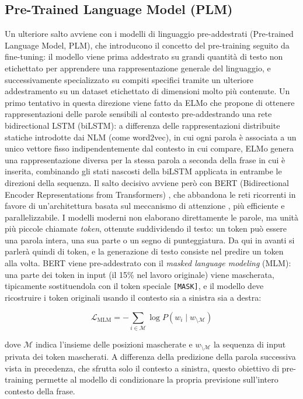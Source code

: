 \subsection{Pre-Trained Language Model (PLM)}
Un ulteriore salto avviene con i modelli di linguaggio pre-addestrati (Pre-trained Language Model, PLM),
 che introducono il concetto del pre-training seguito da fine-tuning: il modello viene prima addestrato su grandi quantità di testo
  non etichettato per apprendere una rappresentazione generale del linguaggio, e successivamente specializzato su compiti specifici 
  tramite un ulteriore addestramento su un dataset etichettato di dimensioni molto più contenute.
Un primo tentativo in questa direzione viene fatto da ELMo \cite{peters2018elmo} che propone di ottenere rappresentazioni delle parole
 sensibili al contesto pre-addestrando una rete bidirectional LSTM (biLSTM): a differenza delle rappresentazioni distribuite statiche 
 introdotte dai NLM (come word2vec), in cui ogni parola è associata a un unico vettore fisso indipendentemente dal contesto in cui 
 compare, ELMo genera una rappresentazione diversa per la stessa parola a seconda della frase in cui è inserita, combinando gli 
 stati nascosti della biLSTM applicata in entrambe le direzioni della sequenza.
Il salto decisivo avviene però con BERT (Bidirectional Encoder Representations from Transformers) \cite{devlin2018bert}, che 
abbandona le reti ricorrenti in favore di un'architettura basata sul meccanismo di attenzione \cite{vaswani2017attention}, più
 efficiente e parallelizzabile. I modelli moderni non elaborano direttamente le parole, ma unità più piccole chiamate \emph{token}, ottenute suddividendo il testo: un token può essere una parola intera, una sua parte o un segno di punteggiatura. Da qui in avanti si parlerà quindi di token, e la generazione di testo consiste nel predire un token alla volta. BERT viene pre-addestrato con il \emph{masked language modeling} (MLM): una parte dei token
  in input (il 15\% nel lavoro originale) viene mascherata, tipicamente sostituendola con il token speciale \texttt{[MASK]}, e
   il modello deve ricostruire i token originali usando il contesto sia a sinistra sia a destra:

\[
\mathcal{L}_{\text{MLM}} = - \sum_{i \in \mathcal{M}} \log P(w_i \mid w_{\setminus \mathcal{M}})
\]

dove $\mathcal{M}$ indica l'insieme delle posizioni mascherate e $w_{\setminus \mathcal{M}}$ la sequenza di input privata dei token mascherati. A differenza della predizione della parola successiva vista in precedenza, che sfrutta solo il contesto a sinistra, questo obiettivo di pre-training permette al modello di condizionare la propria previsione sull'intero contesto della frase.

